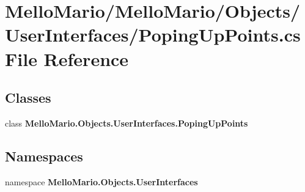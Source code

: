 \section{Mello\+Mario/\+Mello\+Mario/\+Objects/\+User\+Interfaces/\+Poping\+Up\+Points.cs File Reference}
\label{PopingUpPoints_8cs}
\subsection*{Classes}
\begin{DoxyCompactItemize}
\item 
class \textbf{ Mello\+Mario.\+Objects.\+User\+Interfaces.\+Poping\+Up\+Points}
\end{DoxyCompactItemize}
\subsection*{Namespaces}
\begin{DoxyCompactItemize}
\item 
namespace \textbf{ Mello\+Mario.\+Objects.\+User\+Interfaces}
\end{DoxyCompactItemize}
